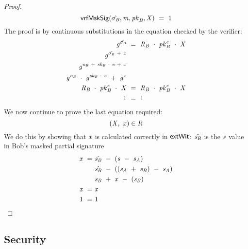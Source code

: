 \begin{proof}
    \[
        \mathsf{vrfMskSig}(\hat{\sigma_{\mathit{B}}},\mathit{m},\mathit{pk}_{\mathit{B}},\mathit{X}) ~=~ 1
    \]
    The proof is by continuous substitutions in the equation checked by the verifier:
    \begin{align}
        \mathit{g}^{\hat{\sigma_{\mathit{B}}}} &~=~ \mathit{R}_{\mathit{B}} ~\cdot~ \mathit{pk}_{\mathit{B}}^{\mathit{e}} ~\cdot~ \mathit{X} \\
        \mathit{g}^{\tilde{\sigma_{\mathit{B}}} ~+~ \mathit{x}} & \\
        \mathit{g}^{\mathit{\mathit{n}_{\mathit{B}}} ~+~ \mathit{sk}_{\mathit{B}} ~\cdot~ \mathit{e} ~+~ \mathit{x}} & \\
        \mathit{g}^{\mathit{\mathit{n}_{\mathit{B}}}} ~\cdot~ \mathit{g}^{\mathit{sk}_{\mathit{B}} ~\cdot~ \mathit{e}} ~+~ \mathit{g}^{\mathit{x}} & \\
        \mathit{R}_{\mathit{B}} ~\cdot~ \mathit{pk}_{\mathit{B}}^{\mathit{e}} ~\cdot~ \mathit{X} &~=~ \mathit{R}_{\mathit{B}} ~\cdot~ \mathit{pk}_{\mathit{B}}^{\mathit{e}} ~\cdot~ \mathit{X} \\
        1 &~=~ 1
    \end{align}
    We now continue to prove the last equation required:
    \[
        (\mathit{X} ,~ \mathit{x}) \in \mathit{R}
    \]
    We do this by showing that $\mathit{x}$ is calculated correctly in $\mathsf{extWit}$:
    $\hat{\mathit{s}_{\mathit{B}}}$ is the $\mathit{s}$ value in Bob's masked partial signature
    \begin{align}
        \mathit{x} ~=~ & \hat{\mathit{s}_{\mathit{B}}} ~-~ (\mathit{s} ~-~ \mathit{s}_{\mathit{A}}) \\
        & \hat{\mathit{s}_{\mathit{B}}} ~-~ ((\mathit{s}_{\mathit{A}} ~+~ \mathit{s}_{\mathit{B}} ) ~-~ \mathit{s}_{\mathit{A}} ) \\
        & \mathit{s}_{\mathit{B}} ~+~ \mathit{x} ~-~ (\mathit{s}_{\mathit{B}}) \\
        \mathit{x} ~=~ & \mathit{x} \\
        1 ~=~ & 1
    \end{align}
\end{proof}

\subsection{Security}\label{subsec:sig:secureaptscheme}

